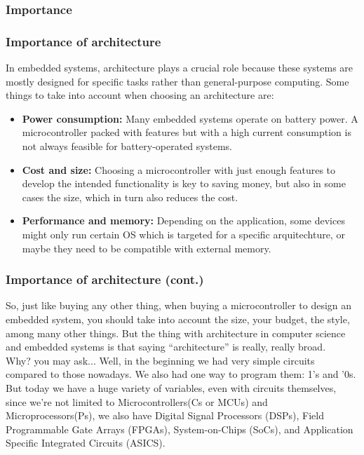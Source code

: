 \documentclass[aspectratio=169]{beamer}
\begin{document}
\subsubsection{Importance}
\begin{frame}
  \frametitle{Importance of architecture}
  In embedded systems, architecture plays a crucial role because these systems are mostly designed for specific tasks rather than general-purpose computing. Some things to take into account when choosing an architecture are:\pause
  \begin{itemize}
    \item <2-> \textbf{Power consumption:} Many embedded systems operate on battery power. A microcontroller packed with features but with a high current consumption is not always feasible for battery-operated systems. 
    \item <3-> \textbf{Cost and size:} Choosing a microcontroller with just enough features to develop the intended functionality is key to saving money, but also in some cases the size, which in turn also reduces the cost.
    \item <4-> \textbf{Performance and memory:} Depending on the application, some devices might only run certain OS which is targeted for a specific arquitechture, or maybe they need to be compatible with external memory. 
  \end{itemize}
\end{frame}

\begin{frame}
  \frametitle{Importance of architecture (cont.)}
  So, just like buying any other thing, when buying a microcontroller to design an embedded system, you should take into account the size, your budget, the style, among many other things. But the thing with architecture in computer science and embedded systems is that saying ``architecture'' is really, really broad. \pause \\[5mm]
  Why? you may ask... Well, in the beginning we had very simple circuits compared to those nowadays. We also had one way to program them: 1's and '0s. But today we have a huge variety of variables, even with circuits themselves, since we're not limited to Microcontrollers(\textmu Cs or MCUs) and Microprocessors(\textmu Ps), we also have Digital Signal Processors (DSPs), Field Programmable Gate Arrays (FPGAs), System-on-Chips (SoCs), and Application Specific Integrated Circuits (ASICS).  
\end{frame}
\end{document}
